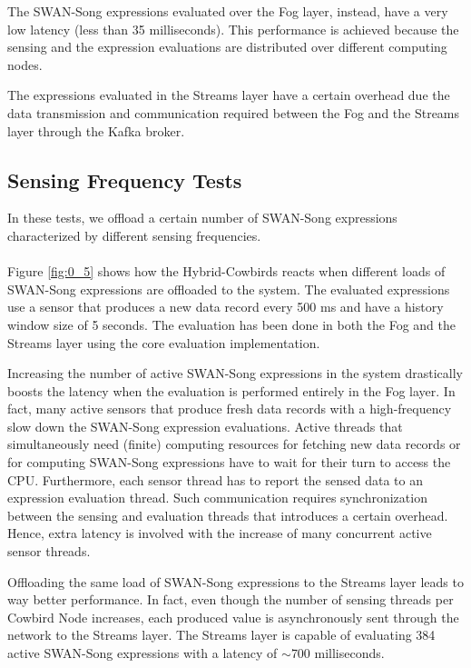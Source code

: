 The SWAN-Song expressions evaluated over the Fog layer, instead, have a very low latency (less than 35 milliseconds). This performance is achieved because the sensing and the expression evaluations are distributed over different computing nodes. 

The expressions evaluated in the Streams layer have a certain overhead due the data transmission and communication required between the Fog and the Streams layer through the Kafka broker. %

\subsection{Sensing Frequency Tests}
In these tests, we offload a certain number of SWAN-Song expressions characterized by different sensing frequencies.
\paragraph{}
Figure \ref{fig:0_5} shows how the Hybrid-Cowbirds reacts when different loads of SWAN-Song expressions are offloaded to the system. The evaluated expressions use a sensor that produces a new data record every 500 ms and have a history window size of 5 seconds. The evaluation has been done in both the Fog and the Streams layer using the core evaluation implementation. 

Increasing the number of active SWAN-Song expressions in the system drastically boosts the latency when the evaluation is performed entirely in the Fog layer. In fact, many active sensors that produce fresh data records with a high-frequency slow down the SWAN-Song expression evaluations. Active threads that simultaneously need (finite) computing resources for fetching new data records or for computing SWAN-Song expressions have to wait for their turn to access the CPU. Furthermore, each sensor thread has to report the sensed data to an expression evaluation thread. Such communication requires synchronization between the sensing and evaluation threads that introduces a certain overhead.
Hence, extra latency is involved with the increase of many concurrent active sensor threads. 

Offloading the same load of SWAN-Song expressions to the Streams layer leads to way better performance. In fact, even though the number of sensing threads per Cowbird Node increases, each produced value is asynchronously sent through the network to the Streams layer. The Streams layer is capable of evaluating 384 active SWAN-Song expressions with a latency of $\sim$700 milliseconds. 

